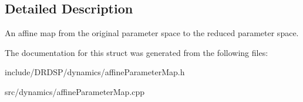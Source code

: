 \subsection{Detailed Description}
An affine map from the original parameter space to the reduced parameter space. 

The documentation for this struct was generated from the following files\-:\begin{DoxyCompactItemize}
\item 
include/\-D\-R\-D\-S\-P/dynamics/affine\-Parameter\-Map.\-h\item 
src/dynamics/affine\-Parameter\-Map.\-cpp\end{DoxyCompactItemize}
